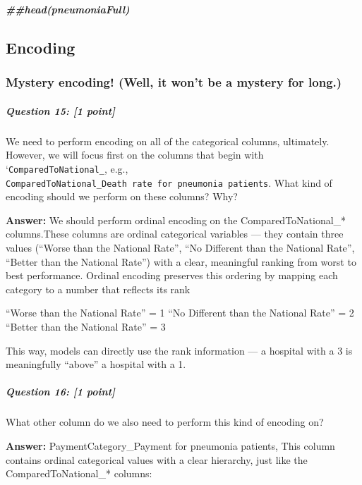 \documentclass[
]{article}
\newenvironment{Shaded}{\begin{snugshade}}{\end{snugshade}}
\newcommand{\DocumentationTok}[1]{\textcolor[rgb]{0.56,0.35,0.01}{\textbf{\textit{#1}}}}
\begin{document}
\begin{Shaded}
\begin{Highlighting}[]
\DocumentationTok{\#\#head(pneumoniaFull)}
\end{Highlighting}
\end{Shaded}

\subsection{Encoding}\label{encoding}

\subsubsection{Mystery encoding! (Well, it won't be a mystery for
long.)}\label{mystery-encoding-well-it-wont-be-a-mystery-for-long.}

\subparagraph{\texorpdfstring{\textbf{Question 15}: {[}1
point{]}}{Question 15: {[}1 point{]}}}\label{question-15-1-point}

We need to perform encoding on all of the categorical columns,
ultimately. However, we will focus first on the columns that begin with
`\texttt{ComparedToNational\_}, e.g.,
\texttt{ComparedToNational\_Death\ rate\ for\ pneumonia\ patients}. What
kind of encoding should we perform on these columns? Why?

\textbf{Answer:} We should perform ordinal encoding on the
ComparedToNational\_* columns.These columns are ordinal categorical
variables --- they contain three values (``Worse than the National
Rate'', ``No Different than the National Rate'', ``Better than the
National Rate'') with a clear, meaningful ranking from worst to best
performance. Ordinal encoding preserves this ordering by mapping each
category to a number that reflects its rank

``Worse than the National Rate'' = 1 ``No Different than the National
Rate'' = 2 ``Better than the National Rate'' = 3

This way, models can directly use the rank information --- a hospital
with a 3 is meaningfully ``above'' a hospital with a 1.

\subparagraph{\texorpdfstring{\textbf{Question 16}: {[}1
point{]}}{Question 16: {[}1 point{]}}}\label{question-16-1-point}

What other column do we also need to perform this kind of encoding on?

\textbf{Answer:} PaymentCategory\_Payment for pneumonia patients, This
column contains ordinal categorical values with a clear hierarchy, just
like the ComparedToNational\_* columns:
\end{document}
